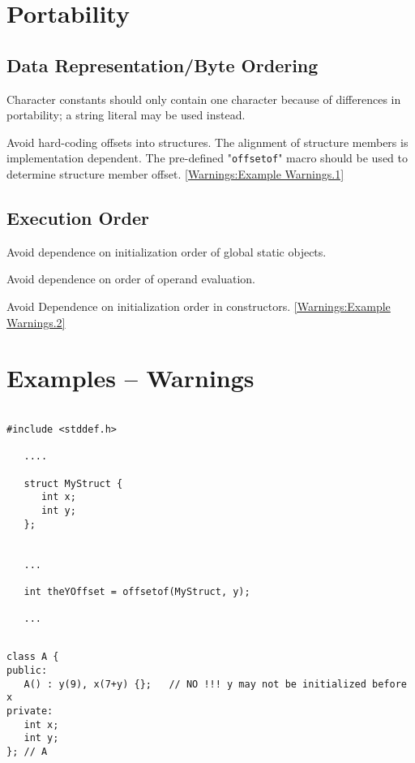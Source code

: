 \section{Portability}
\subsection{Data Representation/Byte Ordering}
Character constants should only contain one character because of
differences in portability; a string literal may be used instead.

Avoid hard-coding offsets into structures.  The alignment
of structure members is implementation dependent.  The pre-defined
"{\tt offsetof}" macro should be used to determine structure member
offset.
\ref{Warnings:Example Warnings.1}


\subsection{Execution Order}
Avoid dependence on initialization order of global static objects.

Avoid dependence on order of operand evaluation.

Avoid Dependence on initialization order in constructors.
\ref{Warnings:Example Warnings.2}


\section{Examples -- Warnings}

\begin{verbatim}

#include <stddef.h>

   ....

   struct MyStruct {
      int x;
      int y;
   };


   ...

   int theYOffset = offsetof(MyStruct, y);

   ...

\end{verbatim}

\begin{verbatim}

class A {
public:
   A() : y(9), x(7+y) {};   // NO !!! y may not be initialized before x
private:
   int x;
   int y;
}; // A

\end{verbatim}
